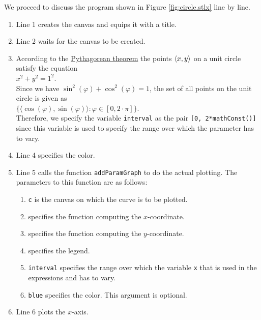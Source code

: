 We proceed to discuss the program shown in Figure \ref{fig:circle.stlx} line by line.
\begin{enumerate}
\item Line 1 creates the canvas and equips it with a title.
\item Line 2 waits for the canvas to be created.
\item According to the \href{https://en.wikipedia.org/wiki/Pythagorean_theorem}{Pythagorean theorem}
      the points $\pair(x,y)$ on a unit circle satisfy the equation
      \\[0.2cm]
      \hspace*{1.3cm}
      $x^2 + y^2 = 1^2$.
      \\[0.2cm]  
      Since we have $\sin^2(\varphi) + \cos^2(\varphi) = 1$, the set of all points on the unit
      circle is given as
      \\[0.2cm]
      \hspace*{1.3cm}
      $\bigl\{\langle \cos(\varphi), \sin(\varphi) \rangle : \varphi \in [0, 2 \cdot \pi] \bigr\}$.
      \\[0.2cm]
      Therefore, we specify the variable \texttt{interval} as the pair \texttt{[0, 2*mathConst()]} 
      since this variable is used to specify the range over which the parameter has to vary.
\item Line 4 specifies the color.
\item Line 5 calls the function \texttt{addParamGraph} to do the actual plotting.  The parameters to
      this function are as follows:
      \begin{enumerate}
      \item \texttt{c} is the canvas on which the curve is to be plotted.
      \item \texttt{} specifies the function computing the $x$-coordinate. 
      \item \texttt{} specifies the function computing the $y$-coordinate. 
      \item \texttt{} specifies the legend.
      \item \texttt{interval} specifies the range over which the variable \texttt{x} that is used in 
            the expressions \texttt{} and \texttt{} has to vary.
      \item \texttt{blue} specifies the color.  This argument is optional.
      \end{enumerate}
\item Line 6 plots the $x$-axis.

\end{enumerate}
